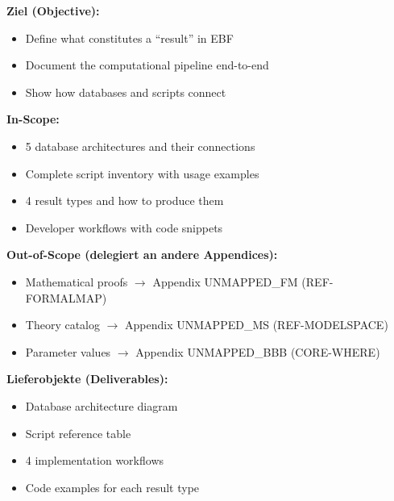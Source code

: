 \begin{tcolorbox}[
    colback=orange!5!white,
    colframe=orange!75!black,
    title={\textbf{Appendix Scope: Ziel / In-Scope / Out-of-Scope / Constraints}},
    fonttitle=\bfseries
]

\textbf{Ziel (Objective):}
\begin{itemize}[nosep]
    \item Define what constitutes a ``result'' in EBF
    \item Document the computational pipeline end-to-end
    \item Show how databases and scripts connect
\end{itemize}

\textbf{In-Scope:}
\begin{itemize}[nosep]
    \item 5 database architectures and their connections
    \item Complete script inventory with usage examples
    \item 4 result types and how to produce them
    \item Developer workflows with code snippets
\end{itemize}

\textbf{Out-of-Scope (delegiert an andere Appendices):}
\begin{itemize}[nosep]
    \item Mathematical proofs $\rightarrow$ Appendix UNMAPPED_FM (REF-FORMALMAP)
    \item Theory catalog $\rightarrow$ Appendix UNMAPPED_MS (REF-MODELSPACE)
    \item Parameter values $\rightarrow$ Appendix UNMAPPED_BBB (CORE-WHERE)
\end{itemize}

\textbf{Lieferobjekte (Deliverables):}
\begin{itemize}[nosep]
    \item Database architecture diagram
    \item Script reference table
    \item 4 implementation workflows
    \item Code examples for each result type
\end{itemize}

\end{tcolorbox}

